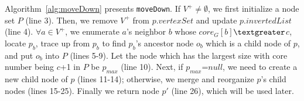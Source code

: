 
Algorithm~\ref{alg:moveDown} presents {\tt moveDown}.
If $V^+$$\neq\emptyset$, we first initialize a node set $P$ (line 3).
Then, we remove $V^+$ from $p.vertexSet$ and update $p.invertedList$ (line 4).
$\forall$$a\in V^+$, we enumerate $a$'s neighbor $b$ whose $core_G[b]$$\textgreater$$c$,
locate $p_b$, trace up from $p_b$ to find $p_b$'s ancestor node $o_b$ which is a child node of $p$,
and put $o_b$ into $P$ (lines 5-9).
Let the node which has the largest size with core number being $c$+1 in $P$ be $p_{max}$ (line 10).
Next, if $p_{max}$=$null$, we need to create a new child node of $p$ (lines 11-14);
otherwise, we merge and reorganize $p$'s child nodes (lines 15-25).
Finally we return node $p'$ (line 26), which will be used later.


